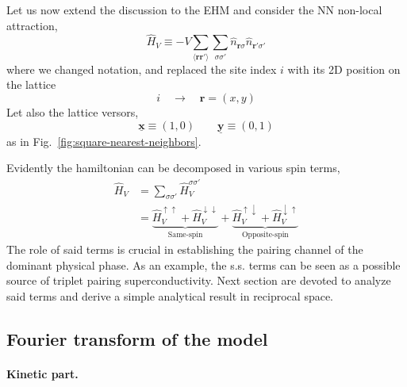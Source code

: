 \color{tabred}

Let us now extend the discussion to the EHM and consider the NN non-local attraction,
\begin{equation}\label{eq:extended-hubbard-nonlocal-interaction}
	\hat H_V \equiv - V \sum_{\langle \mathbf{r} \mathbf{r}' \rangle} \sum_{\sigma \sigma'} \hat n_{\mathbf{r}\sigma} \hat n_{\mathbf{r}'\sigma'}
\end{equation}
where we changed notation, and replaced the site index $i$ with its 2D position on the lattice
\[
	i \quad\to\quad \mathbf{r} = (x,y)
\]
Let also the lattice versors,
\[
	\underline{\mathbf{x}} \equiv (1,0)
	\qquad
	\underline{\mathbf{y}} \equiv (0,1)
\]
as in Fig.~\ref{fig:square-nearest-neighbors}.

Evidently the hamiltonian can be decomposed in various spin terms,
\begin{align}
	\hat H_V &= \sum_{\sigma \sigma'} \hat H_V^{\sigma\sigma'} \nonumber \\
	&= \underbrace{
		\hat H_V^{\uparrow\uparrow} + \hat H_V^{\downarrow\downarrow}
	}_\text{Same-spin} + \underbrace{
		\hat H_V^{\uparrow\downarrow} + \hat H_V^{\downarrow\uparrow}
	}_\text{Opposite-spin} \label{eq:ehm-non-local-ss-os-terms}
\end{align}
The role of said terms is crucial in establishing the pairing channel of the dominant physical phase. As an example, the s.s. terms can be seen as a possible source of triplet pairing superconductivity. Next section are devoted to analyze said terms and derive a simple analytical result in reciprocal space.

\subsection{Fourier transform of the model}\label{subsec:ehm-fourier}


\paragraph{Kinetic part.}

